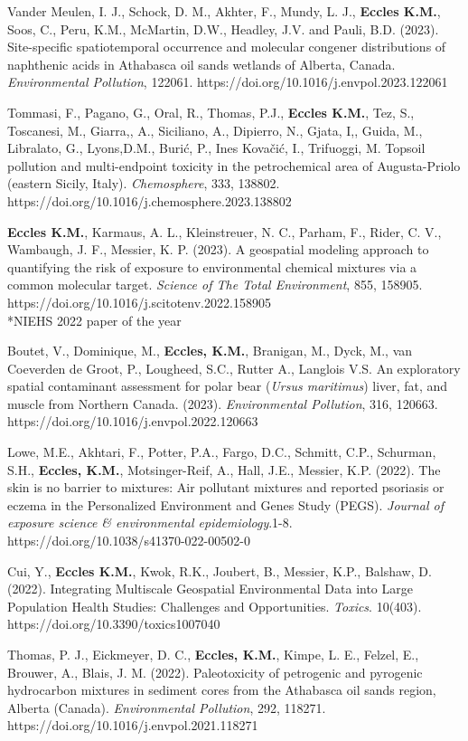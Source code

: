 \documentclass[margin,line]{res}
\begin{document}
\begin{resume}
Vander Meulen, I. J., Schock, D. M., Akhter, F., Mundy, L. J., \textbf{Eccles K.M.}, Soos, C., Peru, K.M., McMartin, D.W., Headley, J.V. and Pauli, B.D. (2023). Site-specific spatiotemporal occurrence and molecular congener distributions of naphthenic acids in Athabasca oil sands wetlands of Alberta, Canada. \textit{Environmental Pollution}, 122061. https://doi.org/10.1016/j.envpol.2023.122061

Tommasi, F., Pagano, G., Oral, R., Thomas, P.J., \textbf{Eccles K.M.}, Tez, S., Toscanesi, M., Giarra,, A., Siciliano, A., Dipierro, N., Gjata, I,, Guida, M., Libralato, G., Lyons,D.M., Burić, P., Ines Kovačić, I.,  Trifuoggi, M. Topsoil pollution and multi-endpoint toxicity in the petrochemical area of Augusta-Priolo (eastern Sicily, Italy). \textit{Chemosphere}, 333, 138802. https://doi.org/10.1016/j.chemosphere.2023.138802

\textbf{Eccles K.M.}, Karmaus, A. L., Kleinstreuer, N. C., Parham, F., Rider, C. V., Wambaugh, J. F., Messier, K. P. (2023). A geospatial modeling approach to quantifying the risk of exposure to environmental chemical mixtures via a common molecular target. \textit{Science of The Total Environment}, 855, 158905. https://doi.org/10.1016/j.scitotenv.2022.158905\\
\mbox{*}NIEHS 2022 paper of the year

Boutet, V., Dominique, M., \textbf{Eccles, K.M.}, Branigan, M., Dyck, M., van Coeverden de Groot, P., Lougheed, S.C., Rutter A., Langlois V.S. An exploratory spatial contaminant assessment for polar bear (\textit{Ursus maritimus}) liver, fat, and muscle from Northern Canada. (2023). \textit{Environmental Pollution},  316, 120663. https://doi.org/10.1016/j.envpol.2022.120663

Lowe, M.E., Akhtari, F., Potter, P.A., Fargo, D.C., Schmitt, C.P., Schurman, S.H., \textbf{Eccles, K.M.}, Motsinger-Reif, A., Hall, J.E., Messier, K.P. (2022). The skin is no barrier to mixtures: Air pollutant mixtures and reported
psoriasis or eczema in the Personalized Environment and Genes Study (PEGS). \textit{Journal of exposure science \& environmental epidemiology}.1-8. https://doi.org/10.1038/s41370-022-00502-0

Cui, Y., \textbf{Eccles K.M.}, Kwok, R.K., Joubert, B., Messier, K.P., Balshaw, D. (2022). Integrating Multiscale Geospatial Environmental Data into Large Population Health Studies: Challenges and Opportunities. \textit{Toxics}. 10(403). https://doi.org/10.3390/toxics1007040

Thomas, P. J., Eickmeyer, D. C., \textbf{Eccles, K.M.}, Kimpe, L. E., Felzel, E., Brouwer, A., Blais, J. M. (2022). Paleotoxicity of petrogenic and pyrogenic hydrocarbon mixtures in sediment cores from the Athabasca oil sands region, Alberta (Canada). \textit{Environmental Pollution}, 292, 118271. \\
https://doi.org/10.1016/j.envpol.2021.118271


\end{resume}
\end{document}
